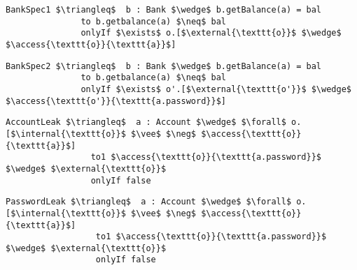 \documentclass[acmsmall,review,anonymous]{acmart}\settopmatter{printfolios=true,printccs=false,printacmref=false}
\begin{document}
\begin{lstlisting}[language = Chainmail, mathescape=true, frame=lines]
BankSpec1 $\triangleq$  b : Bank $\wedge$ b.getBalance(a) = bal 
               to b.getbalance(a) $\neq$ bal
               onlyIf $\exists$ o.[$\external{\texttt{o}}$ $\wedge$ $\access{\texttt{o}}{\texttt{a}}$]
\end{lstlisting}
\begin{lstlisting}[language = Chainmail, mathescape=true, frame=lines]
BankSpec2 $\triangleq$  b : Bank $\wedge$ b.getBalance(a) = bal 
               to b.getbalance(a) $\neq$ bal
               onlyIf $\exists$ o'.[$\external{\texttt{o'}}$ $\wedge$ $\access{\texttt{o'}}{\texttt{a.password}}$]
\end{lstlisting}
\begin{lstlisting}[language = Chainmail, mathescape=true, frame=lines]
AccountLeak $\triangleq$  a : Account $\wedge$ $\forall$ o.[$\internal{\texttt{o}}$ $\vee$ $\neg$ $\access{\texttt{o}}{\texttt{a}}$]
                 to1 $\access{\texttt{o}}{\texttt{a.password}}$ $\wedge$ $\external{\texttt{o}}$
                 onlyIf false
\end{lstlisting}
\begin{lstlisting}[language = Chainmail, mathescape=true, frame=lines]
PasswordLeak $\triangleq$  a : Account $\wedge$ $\forall$ o.[$\internal{\texttt{o}}$ $\vee$ $\neg$ $\access{\texttt{o}}{\texttt{a}}$]
                  to1 $\access{\texttt{o}}{\texttt{a.password}}$ $\wedge$ $\external{\texttt{o}}$
                  onlyIf false
\end{lstlisting}
\end{document}

